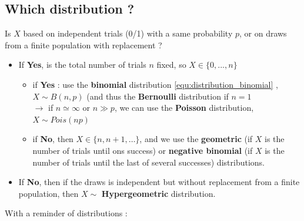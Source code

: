 \documentclass[12pt,a4paper]{article}
\begin{document}
\subsection{Which distribution ?}
\label{app:which_distribution}
Is $X$ based on independent trials (0/1) with a same probability $p$, or on draws from a finite population with replacement ?
\begin{itemize}
    \item     If \textbf{Yes}, is the total number of trials $n$ fixed, so $X \in \{0,...,n\}$
              \begin{itemize}
                  \item if \textbf{Yes} : use the \textbf{binomial} distribution \ref{equ:distribution_binomial} , $X \sim B(n,p)$ (and thus the \textbf{Bernoulli} distribution if $n = 1$\\
                        $\to$ if $n \simeq \infty$ or $n \gg p$, we can use the \textbf{Poisson} distribution, $X \sim Pois(np)$
                  \item if \textbf{No}, then $X \in \{n, n+1, \ldots\}$, and we use the \textbf{geometric} (if $X$ is the number of trials until ons success) or \textbf{negative binomial} (if $X$ is the number of trials until the last of several successes) distributions.
              \end{itemize} 
    \item     If \textbf{No}, then if the draws is independent but without replacement from a finite population, then
    $X \sim$ \textbf{Hypergeometric} distribution.
\end{itemize}
With a reminder of distributions : 
\end{document}
